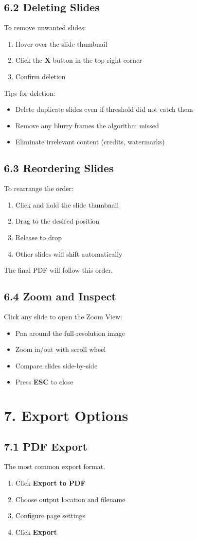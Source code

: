 \documentclass[12pt,a4paper]{article}
\newcommand{\sectionTitle}[1]{\section*{#1}}
\newcommand{\subsectionTitle}[1]{\subsection*{#1}}
\begin{document}
\subsectionTitle{6.2 Deleting Slides}

To remove unwanted slides:
\begin{enumerate}
    \item Hover over the slide thumbnail
    \item Click the \textbf{X} button in the top-right corner
    \item Confirm deletion
\end{enumerate}

Tips for deletion:
\begin{itemize}
    \item Delete duplicate slides even if threshold did not catch them
    \item Remove any blurry frames the algorithm missed
    \item Eliminate irrelevant content (credits, watermarks)
\end{itemize}

\subsectionTitle{6.3 Reordering Slides}

To rearrange the order:
\begin{enumerate}
    \item Click and hold the slide thumbnail
    \item Drag to the desired position
    \item Release to drop
    \item Other slides will shift automatically
\end{enumerate}

The final PDF will follow this order.

\subsectionTitle{6.4 Zoom and Inspect}

Click any slide to open the Zoom View:
\begin{itemize}
    \item Pan around the full-resolution image
    \item Zoom in/out with scroll wheel
    \item Compare slides side-by-side
    \item Press \textbf{ESC} to close
\end{itemize}

\newpage

\sectionTitle{7. Export Options}

\subsectionTitle{7.1 PDF Export}

The most common export format.

\begin{enumerate}
    \item Click \textbf{Export to PDF}
    \item Choose output location and filename
    \item Configure page settings
    \item Click \textbf{Export}
\end{enumerate}
\end{document}
